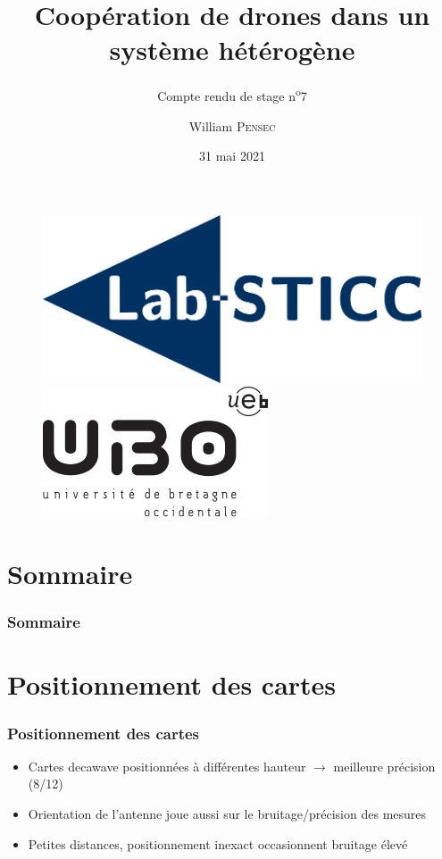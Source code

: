 \documentclass[12pt]{beamer}
\title[Compte rendu de stage n\textsuperscript{o}7]{Coopération de drones dans un système hétérogène}
\subtitle{Compte rendu de stage n\textsuperscript{o}7}
\author{William \textsc{Pensec}}
\institute[Lab-STICC]{Lab-Sticc}
\date{31 mai 2021}
\begin{document}
	\begin{frame}
		\begin{titlepage}
			\begin{figure}[H]
				\centering
				\includegraphics[scale=.15]{labsticc.png}
				\hspace{3cm}
				\includegraphics[scale=.3]{ubo.png}
			\end{figure}
		\end{titlepage}
	\end{frame}
	
	\section*{Sommaire}
	\begin{frame}
		\frametitle{Sommaire}
		\begin{center}
			\tableofcontents
		\end{center}
	\end{frame}
	\section{Positionnement des cartes}
	\begin{frame}[allowframebreaks]
    	\frametitle{Positionnement des cartes}
    	    \begin{block}{}
				\begin{itemize}
    	        [triangle]
				    \item Cartes decawave positionnées à différentes hauteur $\rightarrow$ meilleure précision (8/12)
				    \item Orientation de l'antenne joue aussi sur le bruitage/précision des mesures
				    \item Petites distances, positionnement inexact occasionnent bruitage élevé
				\end{itemize}
			\end{block}
	\end{frame}
\end{document}
